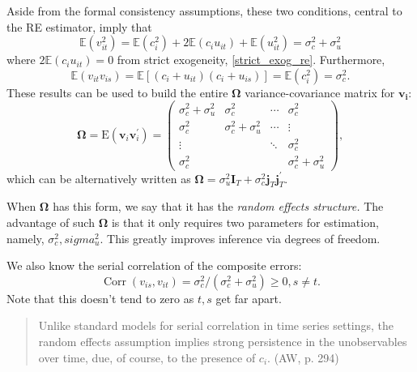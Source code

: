 \documentclass[11pt, a4paper]{report}
\theoremstyle{plain}
\theoremstyle{plain}
\theoremstyle{remark}
\begin{document}
Aside from the formal consistency assumptions, these two conditions, central to the RE estimator, imply that
\begin{equation}
    \mathbb{E}\left(v_{i t}^{2}\right)=\mathbb{E}\left(c_{i}^{2}\right)+2 \mathbb{E}\left(c_{i} u_{i t}\right)+\mathbb{E}\left(u_{i t}^{2}\right)=\sigma_{c}^{2}+\sigma_{u}^{2}
\end{equation}
where $2 \mathbb{E}\left(c_{i} u_{i t}\right) = 0$ from strict exogeneity, \ref{strict_exog_re}. 
Furthermore, 
\begin{equation}
    \mathbb{E}\left(v_{i t} v_{i s}\right)=\mathbb{E}\left[\left(c_{i}+u_{i t}\right)\left(c_{i}+u_{i s}\right)\right]=\mathbb{E}\left(c_{i}^{2}\right)=\sigma_{c}^{2} .
\end{equation}
These results can be used to build the entire $\mathbf{\Omega}$ variance-covariance matrix for $\mathbf{v_i}$:
\begin{equation}
    \boldsymbol{\Omega}=\mathrm{E}\left(\mathbf{v}_{i} \mathbf{v}_{i}^{\prime}\right)=\left(\begin{array}{cccc}
    \sigma_{c}^{2}+\sigma_{u}^{2} & \sigma_{c}^{2} & \cdots & \sigma_{c}^{2} \\
    \sigma_{c}^{2} & \sigma_{c}^{2}+\sigma_{u}^{2} & \cdots & \vdots \\
    \vdots & & \ddots & \sigma_{c}^{2} \\
    \sigma_{c}^{2} & & & \sigma_{c}^{2}+\sigma_{u}^{2}
    \end{array}\right),
    \end{equation}
which can be alternatively written as $\boldsymbol{\Omega}=\sigma_{u}^{2} \mathbf{I}_{T}+\sigma_{c}^{2} \mathbf{j}_{T} \mathbf{j}_{T}^{\prime}$. 

When $\boldsymbol{\Omega}$ has this form, we say that it has the \textit{random effects structure.} The advantage of such $\boldsymbol{\Omega}$ is that it only requires two parameters for estimation, namely, $\sigma_c^2, sigma_u^2$. This greatly improves inference via degrees of freedom.

We also know the serial correlation of the composite errors:
\begin{equation}
    \operatorname{Corr}\left(v_{i s}, v_{i t}\right)=\sigma_{c}^{2} /\left(\sigma_{c}^{2}+\sigma_{u}^{2}\right) \geq 0, s \neq t.
\end{equation}
Note that this doesn't tend to zero as $t, s$ get far apart. 
\begin{quote}
    Unlike standard models for serial correlation in time series settings, the random effects assumption
implies strong persistence in the unobservables over time, due, of course, to the
presence of $c_i$. (AW, p. 294)
\end{quote}
\end{document}
